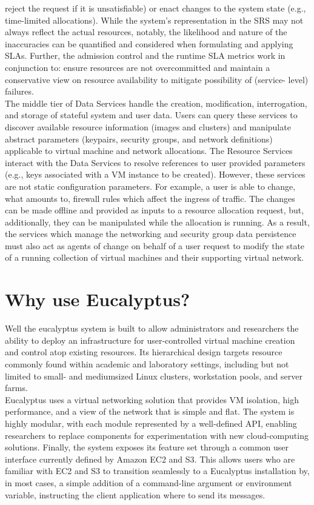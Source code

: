 reject the request if it is unsatisfiable) or enact changes to the system state (e.g., time-limited allocations). While the system's 
representation in the SRS may not always reflect the actual resources, notably, the likelihood and nature of the inaccuracies can be 
quantified and considered when formulating and applying SLAs. Further, the admission control and the runtime SLA metrics work in conjunction 
to: ensure resources are not overcommitted and maintain a conservative view on resource availability to mitigate possibility of 
(service- level) failures.\\ 
The middle tier of Data Services handle the creation, modification, interrogation, and storage of stateful system and user data. Users can 
query these services to discover available resource information (images and clusters) and manipulate abstract parameters (keypairs, 
security groups, and network definitions) applicable to virtual machine and network allocations. The Resource Services interact with the 
Data Services to resolve references to user provided parameters (e.g., keys associated with a VM instance to be created). However, 
these services are not static configuration parameters. For example, a user is able to change, what amounts to, firewall rules which affect 
the ingress of traffic. The changes can be made offline and provided as inputs to a resource allocation request, but, additionally, they 
can be manipulated while the allocation is running. As a result, the services which manage the networking and security group data 
persistence must also act as agents of change on behalf of a user request to modify the state of a running collection of virtual 
machines and their supporting virtual network.
\section{Why use Eucalyptus?}
Well the eucalyptus system is built to allow administrators and researchers the ability to deploy an infrastructure for user-controlled 
virtual machine creation and control atop existing resources. Its hierarchical design targets resource commonly found within academic and 
laboratory settings, including but not limited to small- and mediumsized Linux clusters, workstation pools, and server farms.\\
Eucalyptus uses a virtual networking solution that provides VM isolation, high performance, and a view of the network that is simple and flat. 
The system is highly modular, with each module represented by a well-defined API, enabling researchers to replace components for 
experimentation with new cloud-computing solutions. Finally, the system exposes its feature set through a common user interface currently 
defined by Amazon EC2 and S3. This allows users who are familiar with EC2 and S3 to transition seamlessly to a Eucalyptus installation by, 
in most cases, a simple addition of a command-line argument or environment variable, instructing the client application where to send 
its messages.